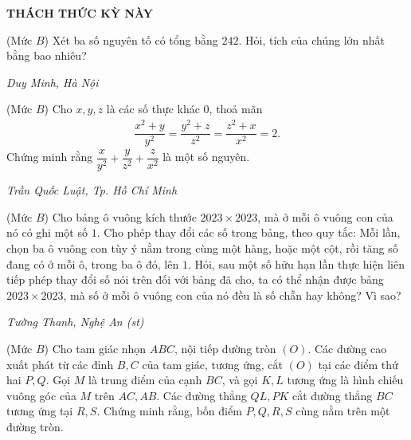 \begin{center}
	\vspace*{-5pt}
	\textbf{\color{thachthuctoanhoc}THÁCH THỨC KỲ NÀY}
	\vspace*{-5pt}
\end{center}
\begin{multicols}{2}
	\setlength{\abovedisplayskip}{4pt}
	\setlength{\belowdisplayskip}{4pt}
	{}
	(Mức $B$) Xét ba số nguyên tố có tổng bằng $242$. Hỏi,  tích của chúng lớn nhất bằng bao nhiêu?
	\begin{flushright}
		\textit{Duy Minh, Hà Nội}
	\end{flushright}
	{}
	(Mức $B$) Cho $x,y,z$ là các số thực khác $0$, thoả mãn 
	\begin{align*}
		\dfrac{x^2+y}{y^2}=\dfrac{y^2+z}{z^2}=\dfrac{z^2+x}{x^2}=2.
	\end{align*}
	Chứng minh rằng $\dfrac x{y^2}+\dfrac y{z^2}+\dfrac z{x^2}$ là một số nguyên.
	\begin{flushright}
		\textit{Trần Quốc Luật, Tp. Hồ Chí Minh}
	\end{flushright}
	{}
	(Mức $B$) Cho bảng ô vuông kích thước $2023 \times 2023$, mà ở mỗi ô vuông con của nó có ghi một số $1$. Cho phép thay đổi các số trong bảng, theo quy tắc: Mỗi lần, chọn ba ô vuông con tùy ý nằm trong cùng một hàng, hoặc một cột, rồi tăng số đang có ở mỗi ô, trong ba ô đó, lên $1$.
	\vskip 0.05cm
	Hỏi, sau một số hữu hạn lần thực hiện liên tiếp phép thay đổi số nói trên đối với bảng đã cho, ta có thể nhận được bảng $2023 \times 2023$, mà số ở mỗi ô vuông con của nó đều là số chẵn hay không? Vì sao?
	\begin{flushright}
		\textit{Tường Thanh, Nghệ An (st)}
	\end{flushright}
	{}
	(Mức $B$) Cho tam giác nhọn $ABC$, nội tiếp đường tròn $(O)$. Các đường cao xuất phát từ các đỉnh $B,C$ của tam giác, tương ứng, cắt $(O)$ tại các điểm thứ hai $P,Q$. Gọi $M$ là trung điểm của cạnh $BC$, và gọi $K, L$ tương ứng là hình chiếu vuông góc của $M$ trên $AC, A B$. Các đường thẳng $Q L, P K$ cắt đường thẳng $B C$ tương ứng tại $R, S$. Chứng minh rằng, bốn điểm $P, Q, R, S$ cùng nằm trên một đường tròn.
	\begin{figure}[H]
		\vspace*{-5pt}
		\centering
		\captionsetup{labelformat= empty, justification=centering}

\end{figure}
\end{multicols}
